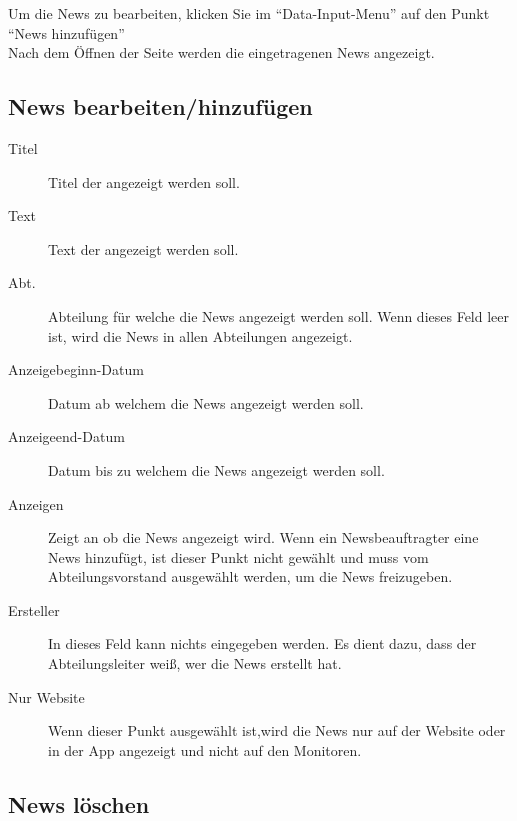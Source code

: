 Um die News zu bearbeiten, klicken Sie im \enquote{Data-Input-Menu} auf den Punkt \enquote{News hinzufügen}
\\
Nach dem Öffnen der Seite werden die eingetragenen News angezeigt.
\\

\subsection{News bearbeiten/hinzufügen}
\begin{description} 
\item[Titel] Titel der angezeigt werden soll.
\item[Text] Text der angezeigt werden soll.
\item[Abt.] Abteilung für welche die News angezeigt werden soll. Wenn dieses Feld leer ist, wird die News in allen Abteilungen angezeigt.
\item[Anzeigebeginn-Datum] Datum ab welchem die News angezeigt werden soll.
\item[Anzeigeend-Datum] Datum bis zu welchem die News angezeigt werden soll.
\item[Anzeigen] Zeigt an ob die News angezeigt wird. Wenn ein Newsbeauftragter eine News hinzufügt, ist dieser Punkt nicht gewählt und muss vom Abteilungsvorstand ausgewählt werden, um die News freizugeben. 
\item[Ersteller] In dieses Feld kann nichts eingegeben werden. Es dient dazu, dass der Abteilungsleiter weiß, wer die News erstellt hat.
\item[Nur Website] Wenn dieser Punkt ausgewählt ist,wird die News nur auf der Website oder in der App angezeigt und nicht auf den Monitoren.
\end{description}

\subsection{News löschen}